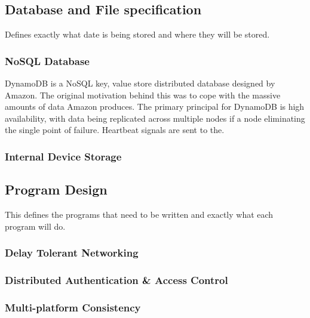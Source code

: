 \documentclass[a4paper, 11pt]{article}
\begin{document}
\subsection{Database and File specification} Defines exactly what date is being stored and where they will be stored.

\subsubsection{NoSQL Database} 
DynamoDB is a NoSQL key, value store distributed database designed by Amazon. The original motivation behind this was to cope with the massive amounts of data Amazon produces. The primary principal for DynamoDB is high availability, with data being replicated across multiple nodes if a node eliminating the single point of failure. Heartbeat signals are sent to the. 
\subsubsection{Internal Device Storage} 

\subsection{Program Design}This defines the programs that need to be written and exactly what each program will do. 

\subsubsection{Delay Tolerant Networking}
\subsubsection{Distributed Authentication \& Access Control}
\subsubsection{Multi-platform Consistency}



\end{document}
